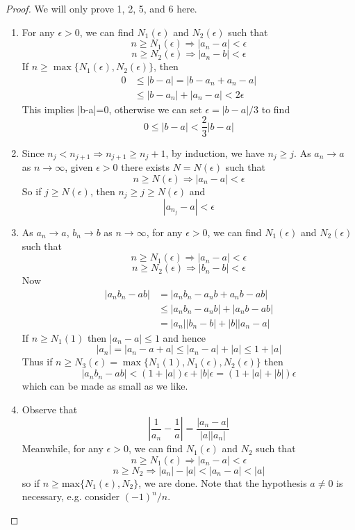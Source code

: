 \documentclass[10pt, a4paper, twoside]{report}
\begin{document}
\begin{proof}
    We will only prove 1, 2, 5, and 6 here.
    \begin{enumerate}
        \item For any \(\epsilon>0\), we can find \(N_1(\epsilon)\) and \(N_2(\epsilon)\) such that
        \[n\geq N_1(\epsilon)\Rightarrow|a_n-a|<\epsilon\]
        \[n\geq N_2(\epsilon)\Rightarrow|a_n-b|<\epsilon\]
        If \(n\geq\max\{N_1(\epsilon),N_2(\epsilon)\}\), then
        \begin{align*}
            0&\leq|b-a|=|b-a_n+a_n-a| \\
            &\leq|b-a_n|+|a_n-a|<2\epsilon
        \end{align*}
        This implies |b-a|=0, otherwise we can set \(\epsilon=|b-a|/3\) to find
        \[0\leq|b-a|<\frac 23|b-a|\]
        \hfill\qedsymbol
        \item Since \(n_j<n_{j+1}\Rightarrow n_{j+1}\geq n_j+1\), by induction, we have \(n_j\geq j\). As \(a_n\to a\) as \(n\to\infty\), given \(\epsilon>0\) there exists \(N=N(\epsilon)\) such that 
        \[n\geq N(\epsilon)\Rightarrow|a_n-a|<\epsilon\]
        So if \(j\geq N(\epsilon)\), then \(n_j\geq j\geq N(\epsilon)\) and 
        \[|a_{n_j}-a|<\epsilon\]
        \hfill\qedsymbol
        \item As \(a_n\to a\), \(b_n\to b\) as \(n\to\infty\), for any \(\epsilon>0\), we can find \(N_1(\epsilon)\) and \(N_2(\epsilon)\) such that
        \[n\geq N_1(\epsilon)\Rightarrow|a_n-a|<\epsilon\]
        \[n\geq N_2(\epsilon)\Rightarrow|b_n-b|<\epsilon\]
        Now
        \begin{align*}
            |a_nb_n-ab|&=|a_nb_n-a_nb+a_nb-ab| \\
            &\leq|a_nb_n-a_nb|+|a_nb-ab| \\
            &=|a_n||b_n-b|+|b||a_n-a|
        \end{align*}
        If \(n\geq N_1(1)\) then \(|a_n-a|\leq 1\) and hence
        \[|a_n|=|a_n-a+a|\leq |a_n-a|+|a|\leq 1+|a|\]
        Thus if \(n\geq N_3(\epsilon)=\max\{N_1(1),N_1(\epsilon),N_2(\epsilon)\}\) then
        \[|a_nb_n-ab|<(1+|a|)\epsilon+|b|\epsilon=(1+|a|+|b|)\epsilon\]
        which can be made as small as we like.
        \item Observe that 
        \[\left|\frac 1{a_n}-\frac 1a\right|=\frac{|a_n-a|}{|a||a_n|}\]
        Meanwhile, for any \(\epsilon>0\), we can find \(N_1(\epsilon)\) and \(N_2\) such that
        \[n\geq N_1(\epsilon)\Rightarrow|a_n-a|<\epsilon\]
        \[n\geq N_2\Rightarrow|a_n|-|a|<|a_n-a|<|a|\]
        so if \(n\geq\text{max}\{N_1(\epsilon),N_2\}\), we are done. Note that the hypothesis \(a\neq 0\) is necessary, e.g. consider \((-1)^n/n\).
    \end{enumerate}
\end{proof}
\end{document}
